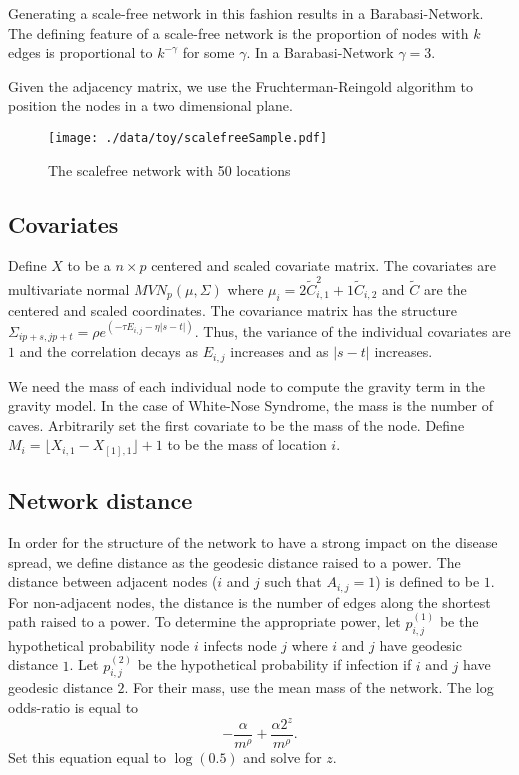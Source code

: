 \documentclass[11pt]{article}
\begin{document}
Generating a scale-free network in this fashion results in a
Barabasi-Network.  The defining feature of a scale-free network is the
proportion of nodes with $k$ edges is proportional to $k^{-\gamma}$
for some $\gamma$.  In a Barabasi-Network $\gamma = 3$.

Given the adjacency matrix, we use the Fruchterman-Reingold algorithm
to position the nodes in a two dimensional plane.


\begin{figure}[htb]
\centering
\texttt{[image: ./data/toy/scalefreeSample.pdf]}
\caption{\label{fig:scalefree50}The scalefree network with 50 locations}
\end{figure}




\subsection{Covariates}
\label{sec-3-2}

Define $X$ to be a $n \times p$ centered and scaled covariate matrix.
The covariates are multivariate normal $MVN_p(\mu,\Sigma)$ where
$\mu_i = 2\widetilde{C}_{i,1}^2 + 1\widetilde{C}_{i,2}$ and
$\widetilde{C}$ are the centered and scaled coordinates.  The
covariance matrix has the structure $\Sigma_{ip + s, jp + t} =
\rho e^{(-\tau  E_{i,j} - \eta |s-t|)}$.  Thus, the variance of the
individual covariates are $1$ and the correlation decays as $E_{i,j}$
increases and as $|s-t|$ increases.

We need the mass of each individual node to compute the gravity term
in the gravity model.  In the case of White-Nose Syndrome, the mass is
the number of caves.  Arbitrarily set the first covariate to be the
mass of the node.  Define $M_i = \lfloor X_{i,1} - X_{[1],1} \rfloor +
1$ to be the mass of location $i$.


\subsection{Network distance}
\label{sec-3-3}

In order for the structure of the network to have a strong impact on
the disease spread, we define distance as the geodesic distance raised
to a power.  The distance between adjacent nodes ($i$ and $j$ such
that $A_{i,j} = 1$) is defined to be $1$.  For non-adjacent nodes, the
distance is the number of edges along the shortest path raised to a
power.  To determine the appropriate power, let $p^{(1)}_{i,j}$ be the
hypothetical probability node $i$ infects node $j$ where $i$ and $j$
have geodesic distance $1$.  Let $p^{(2)}_{i,j}$ be the hypothetical
probability if infection if $i$ and $j$ have geodesic distance $2$.
For their mass, use the mean mass of the network.  The log odds-ratio
is equal to
\begin{equation*}
  - \frac{\alpha}{m^\rho} + \frac{\alpha2^z}{m^\rho}.
\end{equation*}
Set this equation equal to $\log(0.5)$ and solve for $z$.
\end{document}
